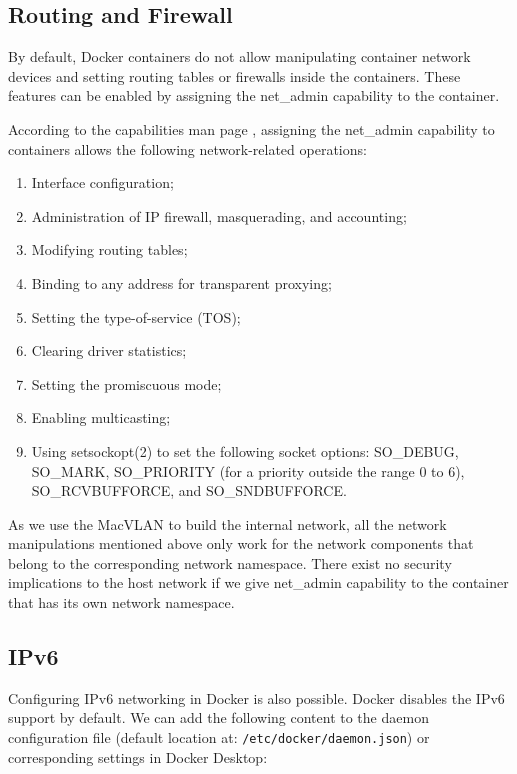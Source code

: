 \documentclass[article]{aaltoseries}
\begin{document}
\subsection{Routing and Firewall}

By default, Docker containers do not allow manipulating container network devices and setting routing tables or firewalls inside the containers. These features can be enabled by assigning the net\_admin capability to the container.

According to the capabilities man page \cite{capabilities}, assigning the net\_admin capability to containers allows the following network-related operations:
\begin{enumerate}
\setlength{\itemsep}{0pt}
\setlength{\parsep}{0pt}
\setlength{\parskip}{0pt}
\item Interface configuration;
\item Administration of IP firewall, masquerading, and accounting;
\item Modifying routing tables;
\item Binding to any address for transparent proxying;
\item Setting the type-of-service (TOS);
\item Clearing driver statistics;
\item Setting the promiscuous mode;
\item Enabling multicasting;
\item Using setsockopt(2) to set the following socket options:
SO\_DEBUG, SO\_MARK, SO\_PRIORITY (for a priority outside the
range 0 to 6), SO\_RCVBUFFORCE, and SO\_SNDBUFFORCE.
\end{enumerate}

As we use the MacVLAN to build the internal network, all the network manipulations mentioned above only work for the network components that belong to the corresponding network namespace. There exist no security implications to the host network if we give net\_admin capability to the container that has its own network namespace.

\subsection{IPv6}
Configuring IPv6 networking in Docker \cite{docker_documentation_ipv6_2023} is also possible. Docker disables the IPv6 support by default. We can add the following content to the daemon configuration file (default location at: \texttt{/etc/docker/daemon.json}) or corresponding settings in Docker Desktop:
\end{document}
